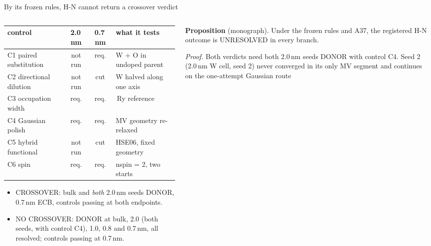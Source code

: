 \begin{frame}{By its frozen rules, H-N cannot return a crossover verdict}
  \elevenTop\elevendense
  \begin{columns}[T,onlytextwidth]
    \begin{column}{0.54\textwidth}
      \begingroup\scriptsize
      \setlength{\tabcolsep}{3.4pt}
      \renewcommand{\arraystretch}{1.08}
      \begin{tabularx}{\linewidth}{@{}l c c >{\raggedright\arraybackslash}X@{}}
        \toprule
        control & 2.0\,nm & 0.7\,nm & what it tests \\
        \midrule
        C1 paired substitution & not run & req. & W + O in undoped parent \\
        C2 directional dilution & not run & cut & W halved along one axis \\
        C3 occupation width & req. & req. & 0.001\,Ry reference \\
        C4 Gaussian polish & req. & req. & MV geometry re-relaxed \\
        C5 hybrid functional & not run & cut & HSE06, fixed geometry \\
        C6 spin & req. & req. & nspin = 2, two starts \\
        \bottomrule
      \end{tabularx}\par\endgroup
      \vspace{0.4mm}
      \begin{itemize}
        \item CROSSOVER: bulk and \emph{both} 2.0\,nm seeds DONOR, 0.7\,nm ECB, controls passing at both
          endpoints.
        \item NO CROSSOVER: DONOR at bulk, 2.0 (both seeds, with control C4), 1.0, 0.8 and 0.7\,nm, all resolved;
          controls passing at 0.7\,nm.
      \end{itemize}
    \end{column}
    \begin{column}{0.42\textwidth}
      {\footnotesize\textbf{Proposition} (monograph). Under the frozen rules and A37, the registered H-N outcome is
        UNRESOLVED in every branch.\par}
      \vspace{1.2mm}
      {\footnotesize\textit{Proof.} Both verdicts need both 2.0\,nm seeds DONOR with control C4. Seed 2
        (2.0\,nm W cell, seed 2) never converged in its only MV segment and continues on the one-attempt Gaussian route
}
\end{column}
\end{columns}
\end{frame}
